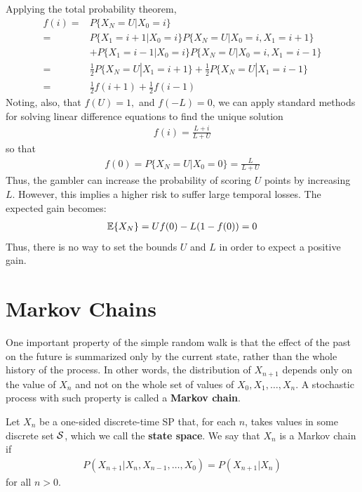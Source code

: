 Applying the total probability theorem,
\begin{align}
f(i) =& P\{X_N = U | X_0 = i\}  \nonumber \\
     =& P\{X_1 = i+1 | X_0 = i\} P\{X_N = U | X_0 = i, X_1 = i+1\}   \nonumber \\
      &+ P\{X_1 = i-1 | X_0 = i\} P\{X_N = U | X_0 = i, X_1 = i-1\}   \nonumber\\
     =& \frac12 P\{X_N = U | X_1 = i+1\} + \frac12 P\{X_N = U | X_1 = i-1\} \nonumber\\
     =& \frac12 f (i+1) + \frac12 f(i-1)
\end{align}
Noting, also, that $f(U)=1,$ and $f(-L) = 0$, we can apply standard methods for solving linear difference equations to find the unique solution
\begin{align}
f(i) = \frac{L+i}{L+U}
\end{align}
so that
\begin{align}
f(0) = P\{X_N = U | X_0 = 0\} = \frac{L}{L+U}
\end{align}
Thus, the gambler can increase the probability of scoring $U$ points by increasing $L$. However, this implies a higher risk to suffer large temporal losses. The expected gain becomes:
\begin{align}
\mathbb{E}\{X_N\} = U f(0) - L (1-f(0)) = 0
\end{align}
Thus, there is no way to set the bounds $U$ and $L$ in order to expect a positive gain.



\section{Markov Chains}

One important property of the simple random walk is that the effect of the past on the future is summarized only by the current state, rather than the whole history of the process. In other words, the distribution of $X_{n+1}$ depends only on the value of $X_n$ and not on the whole set of values of $X_0, X_1, \ldots, X_n$. A stochastic process with such property is called a \textbf{Markov chain}.

\begin{definition}
Let $X_n$ be a one-sided discrete-time SP that, for each $n$, takes values in some discrete set ${\cal S}$, which we call  the \textbf{state space}. We say that $X_n$ is a Markov chain if
\begin{align}
P(X_{n+1} | X_n, X_{n-1}, \ldots, X_0) = P(X_{n+1} | X_n)
\label{SP:markov_chain}
\end{align}
for all $n > 0$. 

\end{definition}

